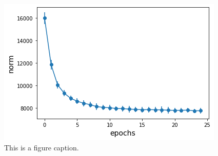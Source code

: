\begin{figure}
\centering
\includegraphics[scale=0.25]{figs/path-gram.png}
\caption{\label{fig:frog1}This is a figure caption.}
\end{figure}

